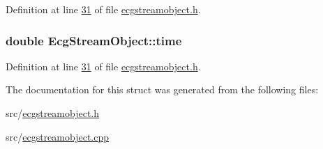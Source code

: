 Definition at line \hyperlink{ecgstreamobject_8h_source_l00031}{31} of file \hyperlink{ecgstreamobject_8h_source}{ecgstreamobject.\+h}.

\subsubsection[{time}]{\setlength{\rightskip}{0pt plus 5cm}double Ecg\+Stream\+Object\+::time}\hypertarget{structEcgStreamObject_a79a47ddd0a7c6c432d12b0da042091bf}{}\label{structEcgStreamObject_a79a47ddd0a7c6c432d12b0da042091bf}


Definition at line \hyperlink{ecgstreamobject_8h_source_l00031}{31} of file \hyperlink{ecgstreamobject_8h_source}{ecgstreamobject.\+h}.



The documentation for this struct was generated from the following files\+:\begin{DoxyCompactItemize}
\item 
src/\hyperlink{ecgstreamobject_8h}{ecgstreamobject.\+h}\item 
src/\hyperlink{ecgstreamobject_8cpp}{ecgstreamobject.\+cpp}\end{DoxyCompactItemize}
